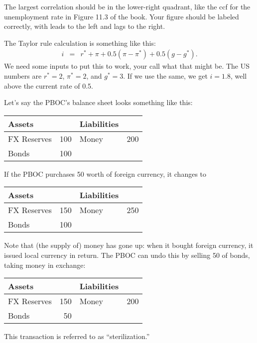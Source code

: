 \documentclass[letterpaper,12pt]{exam}
\begin{document}
\begin{questions}
\begin{solution}
\begin{parts}
\item The largest correlation should be in the lower-right quadrant,
like the ccf for the unemployment rate in Figure 11.3 of the book.
Your figure should be labeled correctly, with leads to the left and
lags to the right.

\item The Taylor rule calculation is something like this:
\begin{eqnarray*}
    i &=& r^* + \pi + 0.5 (\pi - \pi^*) + 0.5 (g - g^*) .
\end{eqnarray*}
We need some inputs to put this to work, your call what that might be.
The US numbers are
$ r^* = 2$, $\pi^* = 2$, and $g^* = 3$.
If we use the same, we get $i = 1.8$, well above the current rate of 0.5.

\item Let's say the PBOC's balance sheet looks something like this:
%
\begin{center}
\begin{tabular}{lr|lr}
               Assets  &     &     Liabilities                     \\
               \hline
               FX Reserves &  100 &     Money &  200   \\
               Bonds   & 100 & \\
\end{tabular}
\end{center}
%
If the PBOC purchases 50 worth of foreign currency,
it changes to
%
\begin{center}
\begin{tabular}{lr|lr}
               Assets  &     &     Liabilities                     \\
               \hline
               FX Reserves &  150 &     Money  &  250   \\
               Bonds   & 100 & \\
\end{tabular}
\end{center}
%
Note that (the supply of) money has gone up:  when it bought foreign currency,
it issued local currency in return.
The PBOC can undo this by selling 50 of bonds, taking money
in exchange:
%
\begin{center}
\begin{tabular}{lr|lr}
               Assets  &     &     Liabilities                     \\
               \hline
               FX Reserves &  150 &     Money  &  200   \\
               Bonds   & 50 & \\
\end{tabular}
\end{center}
%
This transaction is referred to as ``sterilization.''


\end{parts}
\end{solution}
\end{questions}
\end{document}
